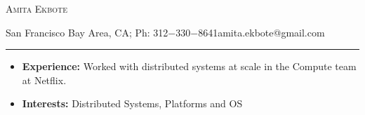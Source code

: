 \documentclass[10pt,oneside]{article}
\makeatletter
\newcommand{\name}{Amita Ekbote}
\newcommand{\addr}{San Francisco Bay Area, CA}
\newcommand{\phone}{312$-$330$-$8641}
\newcommand{\email}{amita.ekbote@gmail.com}
\newcommand{\bigname}[1]{\begin{center}\Huge\scshape#1\end{center}}
\makeatother
\begin{document}
\bigname{\name}
{\small \addr; Ph: \phone\hfill\email}
\vspace{0pt}
\rule[3mm]{\textwidth}{1pt}

\vspace{-10 pt}



  

{}


  \begin{itemize}
    \item \textbf{Experience:} Worked with distributed systems at scale in the Compute team at Netflix.
    \item \textbf{Interests:} Distributed Systems, Platforms and OS
  \end{itemize}
\end{document}

